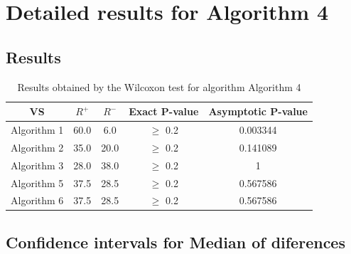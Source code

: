 \documentclass[a4paper,10pt]{article}
\begin{document}
 \clearpage 


\section{Detailed results for Algorithm 4}


\subsection{Results}

\begin{table}[!htp]
\centering\small
\begin{tabular}{
|c|c|c|c|c|}
\hline
 VS & $R^{+}$ & $R^{-}$ & Exact P-value & Asymptotic P-value \\ \hline 
Algorithm 1 & 60.0 & 6.0 & $\geq$ 0.2 & 0.003344\\ \hline 
Algorithm 2 & 35.0 & 20.0 & $\geq$ 0.2 & 0.141089\\ \hline 
Algorithm 3 & 28.0 & 38.0 & $\geq$ 0.2 & 1\\ \hline 
Algorithm 5 & 37.5 & 28.5 & $\geq$ 0.2 & 0.567586\\ \hline 
Algorithm 6 & 37.5 & 28.5 & $\geq$ 0.2 & 0.567586\\ \hline 

\end{tabular}
\caption{Results obtained by the Wilcoxon test for algorithm Algorithm 4}
\end{table}

\subsection{Confidence intervals for Median of diferences}
\end{document}
